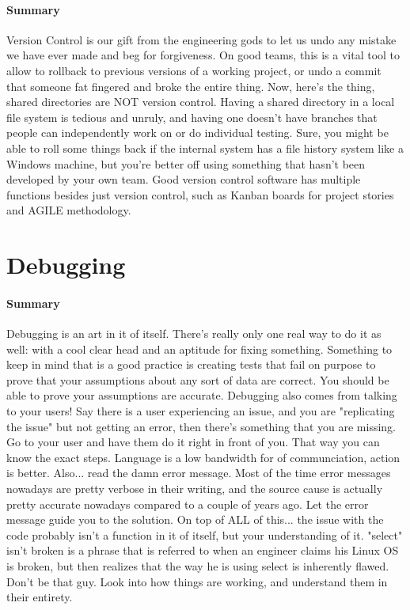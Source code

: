 \documentclass{article}
\begin{document}
    \paragraph{Summary} Version Control is our gift from the engineering gods to let us undo any mistake we have ever made and beg for forgiveness. On good teams, this is a vital tool to allow to rollback to previous versions of a working project, or undo a commit that someone fat fingered and broke the entire thing. Now, here's the thing, shared directories are NOT version control. Having a shared directory in a local file system is tedious and unruly, and having one doesn't have branches that people can independently work on or do individual testing. Sure, you might be able to roll some things back if the internal system has a file history system like a Windows machine, but you're better off using something that hasn't been developed by your own team. Good version control software has multiple functions besides just version control, such as Kanban boards for project stories and AGILE methodology.

\section{Debugging}
    \paragraph{Summary} Debugging is an art in it of itself. There's really only one real way to do it as well: with a cool clear head and an aptitude for fixing something. Something to keep in mind that is a good practice is creating tests that fail on purpose to prove that your assumptions about any sort of data are correct. You should be able to prove your assumptions are accurate. Debugging also comes from talking to your users! Say there is a user experiencing an issue, and you are "replicating the issue" but not getting an error, then there's something that you are missing. Go to your user and have them do it right in front of you. That way you can know the exact steps. Language is a low bandwidth for of communciation, action is better. Also... read the damn error message. Most of the time error messages nowadays are pretty verbose in their writing, and the source cause is actually pretty accurate nowadays compared to a couple of years ago. Let the error message guide you to the solution. On top of ALL of this... the issue with the code probably isn't a function in it of itself, but your understanding of it. "select" isn't broken is a phrase that is referred to when an engineer claims his Linux OS is broken, but then realizes that the way he is using select is inherently flawed. Don't be that guy. Look into how things are working, and understand them in their entirety.
\end{document}
